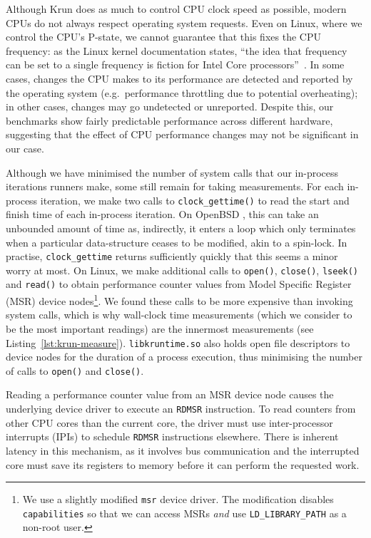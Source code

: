 \documentclass[preprint,numbers,10pt]{sigplanconf}
\newcommand{\krun}{Krun\xspace}
\begin{document}
Although \krun does as much to control CPU clock speed as possible, modern CPUs
do not always respect operating system requests. Even on Linux, where we control
the CPU's P-state, we cannot guarantee that this fixes the CPU frequency: as
the Linux kernel documentation states, ``the idea that frequency can be set to a single
frequency is fiction for Intel Core processors''~\cite{pstate}. In
some cases, changes the CPU makes to its performance are detected and reported
by the operating system (e.g.~performance throttling due to potential
overheating); in other cases, changes may go undetected or unreported.
Despite this, our benchmarks show fairly predictable performance across
different hardware, suggesting that the effect of CPU performance changes may
not be significant in our case.

Although we have minimised the number of system calls that our in-process
iterations runners make, some still remain for taking measurements. For each
in-process iteration, we make two calls to \texttt{clock\_gettime()} to
read the start and finish time of each in-process iteration. On OpenBSD
, this can take an
unbounded amount of time as, indirectly, it enters a loop which only terminates
when a particular data-structure ceases to be modified, akin to a spin-lock. In
practise, \texttt{clock\_gettime} returns sufficiently quickly that this seems a
minor worry at most.
On Linux, we make additional calls to \texttt{open()}, \texttt{close()},
\texttt{lseek()} and \texttt{read()} to obtain performance counter values from
Model Specific Register (MSR) device nodes\footnote{We use a slightly modified
    \texttt{msr} device driver. The modification disables \texttt{capabilities}
so that we can access MSRs \emph{and} use \texttt{LD\_LIBRARY\_PATH} as a
non-root user.}. We found these calls to be more expensive than invoking system
calls, which is why wall-clock time measurements (which we consider to be the
most important readings) are the innermost measurements (see
Listing~\ref{lst:krun-measure}). \texttt{libkruntime.so} also holds open file
descriptors to device nodes for the duration of a process execution, thus
minimising the number of calls to \texttt{open()} and \texttt{close()}.

Reading a performance counter value from an MSR device node causes the
underlying device driver to execute an \texttt{RDMSR} instruction. To read
counters from other CPU cores than the current core, the driver must use
inter-processor interrupts (IPIs) to schedule \texttt{RDMSR} instructions
elsewhere. There is inherent latency in this mechanism, as it involves bus
communication and the interrupted core must save its registers to memory before
it can perform the requested work.
\end{document}
